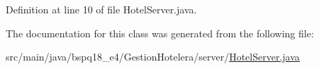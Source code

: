 Definition at line 10 of file Hotel\+Server.\+java.



The documentation for this class was generated from the following file\+:\begin{DoxyCompactItemize}
\item 
src/main/java/bspq18\+\_\+e4/\+Gestion\+Hotelera/server/\mbox{\hyperlink{_hotel_server_8java}{Hotel\+Server.\+java}}\end{DoxyCompactItemize}
